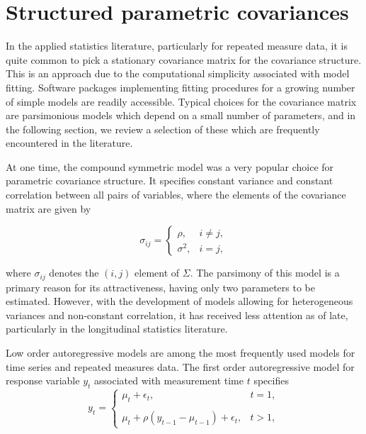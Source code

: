 \section{Structured parametric covariances} \label{chapter-1-parametric-covariance-models}


In the applied statistics literature, particularly for repeated measure data, it is quite common to pick a stationary covariance matrix for the covariance structure. This is an approach due to the computational simplicity associated with model fitting. Software packages implementing fitting procedures for a growing number of simple models are readily accessible. Typical choices for the covariance matrix are parsimonious models which depend on a small number of parameters, and in the following section, we  review a selection of these which are frequently encountered in the literature.

\bigskip

At one time, the compound symmetric model was a very popular choice for parametric covariance structure. It specifies constant variance and constant correlation between all pairs of variables, where the elements of the covariance matrix are given by

\begin{equation}\label{eq:compound-symmetric-model}
\sigma_{ij} = \left\{ \begin{array}{lr}
\rho, & i \ne j,\\
\sigma^2, & i = j, 
\end{array}\right.
\end{equation}

\noindent
where $\sigma_{ij}$ denotes the $\left(i,j\right)$ element of $\Sigma$. The parsimony of this model is a primary reason for its attractiveness, having only two parameters to be estimated. However, with the development of models allowing for heterogeneous variances and non-constant correlation, it has received less attention as of late, particularly in the longitudinal statistics literature. 

\bigskip

Low order autoregressive models are among the most frequently used models for time series and repeated measures data. The first order autoregressive model for response variable $y_t$ associated with measurement time $t$ specifies
\begin{equation}\label{eq:ar-1-model}
y_{t} = \left\{ \begin{array}{lr}
\mu_t + \epsilon_t, & t = 1,\\
& \\
\mu_t + \rho\left(y_{t-1} - \mu_{t-1}\right) + \epsilon_t, & t > 1,
\end{array}\right.
\end{equation}

